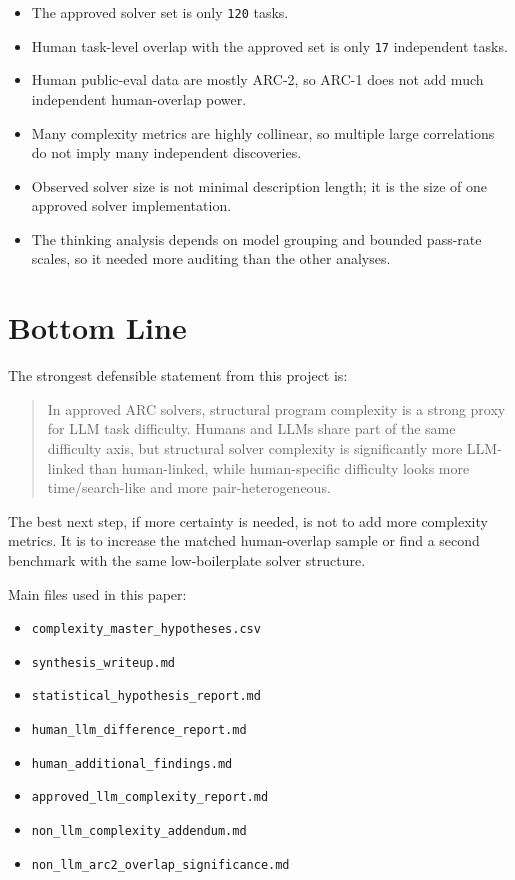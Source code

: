 \documentclass[11pt]{article}
\begin{document}
\begin{itemize}
  \item The approved solver set is only \texttt{120} tasks.
  \item Human task-level overlap with the approved set is only \texttt{17} independent tasks.
  \item Human public-eval data are mostly ARC-2, so ARC-1 does not add much independent human-overlap power.
  \item Many complexity metrics are highly collinear, so multiple large correlations do not imply many independent discoveries.
  \item Observed solver size is not minimal description length; it is the size of one approved solver implementation.
  \item The thinking analysis depends on model grouping and bounded pass-rate scales, so it needed more auditing than the other analyses.
\end{itemize}

\section*{Bottom Line}

The strongest defensible statement from this project is:

\begin{quote}
In approved ARC solvers, structural program complexity is a strong proxy for LLM task difficulty. Humans and LLMs share part of the same difficulty axis, but structural solver complexity is significantly more LLM-linked than human-linked, while human-specific difficulty looks more time/search-like and more pair-heterogeneous.
\end{quote}

The best next step, if more certainty is needed, is not to add more complexity metrics. It is to increase the matched human-overlap sample or find a second benchmark with the same low-boilerplate solver structure.

\vspace{0.5em}
\noindent Main files used in this paper:
\begin{itemize}
  \item \texttt{complexity\_master\_hypotheses.csv}
  \item \texttt{synthesis\_writeup.md}
  \item \texttt{statistical\_hypothesis\_report.md}
  \item \texttt{human\_llm\_difference\_report.md}
  \item \texttt{human\_additional\_findings.md}
  \item \texttt{approved\_llm\_complexity\_report.md}
  \item \texttt{non\_llm\_complexity\_addendum.md}
  \item \texttt{non\_llm\_arc2\_overlap\_significance.md}
\end{itemize}
\end{document}
